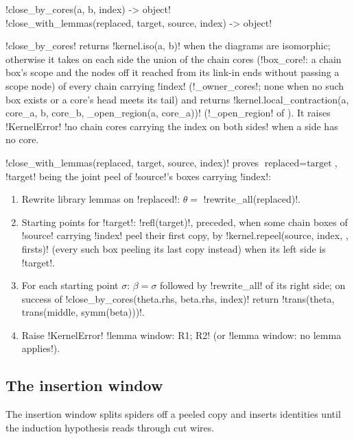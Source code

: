 \begin{signature}
\py!close_by_cores(a, b, index) -> object!\\
\py!close_with_lemmas(replaced, target, source, index) -> object!
\end{signature}
\py!close_by_cores! returns \py!kernel.iso(a, b)! when the diagrams are isomorphic; otherwise it takes on each side the union of the chain cores (\py!box_core!: a chain box's scope and the nodes off it reached from its link-in ends without passing a scope node) of every chain \bbox{} carrying \py!index! (\py!_owner_cores!; none when no such box exists or a core's head meets its tail) and returns \py!kernel.local_contraction(a, core_a, b, core_b, _open_region(a, core_a))! (\py!_open_region! of ). It raises \py!KernelError! \code!no chain cores carrying the index on both sides! when a side has no core.

\begin{algorithm}\label{alg:proofs-lemma-window}
\py!close_with_lemmas(replaced, target, source, index)! proves $\text{replaced}=\text{target}$, \py!target! being the joint peel of \py!source!'s boxes carrying \py!index!:
\begin{enumerate}
\item Rewrite library lemmas on \py!replaced!: $\theta=$ \py!rewrite_all(replaced)!.
\item Starting points for \py!target!: \py!refl(target)!, preceded, when some chain boxes of \py!source! carrying \py!index! peel their first copy, by \py!kernel.repeel(source, index, {}, firsts)! (every such box peeling its last copy instead) when its left side is \py!target!.
\item For each starting point $\sigma$: $\beta=\sigma$ followed by \py!rewrite_all! of its right side; on success of \py!close_by_cores(theta.rhs, beta.rhs, index)! return \py!trans(theta, trans(middle, symm(beta)))!.
\item Raise \py!KernelError! \code!lemma window: R1; R2! (or \code!lemma window: no lemma applies!).
\end{enumerate}
\end{algorithm}

\subsection{The insertion window}

The insertion window splits spiders off a peeled copy and inserts identities until the induction hypothesis reads through cut wires.

